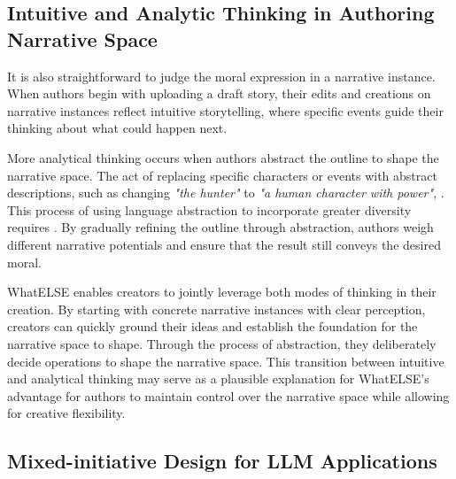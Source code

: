 \subsection{Intuitive and Analytic Thinking in Authoring Narrative Space} 

 It is also straightforward to judge the moral expression in a narrative instance. When authors begin with uploading a draft story, their edits and creations on narrative instances reflect intuitive storytelling, where specific events guide their thinking about what could happen next.  

More analytical thinking occurs when authors abstract the outline to shape the narrative space. The act of replacing specific characters or events with abstract descriptions, such as changing {\it "the hunter"} to {\it "a human character with power"}, . This process of using language abstraction to incorporate greater diversity requires . By gradually refining the outline through abstraction, authors weigh different narrative potentials and ensure that the result still conveys the desired moral.

{\sc WhatELSE} enables creators to jointly leverage both modes of thinking in their creation. By starting with concrete narrative instances with clear perception, creators can quickly ground their ideas and establish the foundation for the narrative space to shape. Through the process of abstraction, they deliberately decide operations to shape the narrative space. This transition between intuitive and analytical thinking may serve as a plausible explanation for {\sc WhatELSE}'s advantage for authors to maintain control over the narrative space while allowing for creative flexibility.


\subsection{Mixed-initiative Design for LLM Applications}


